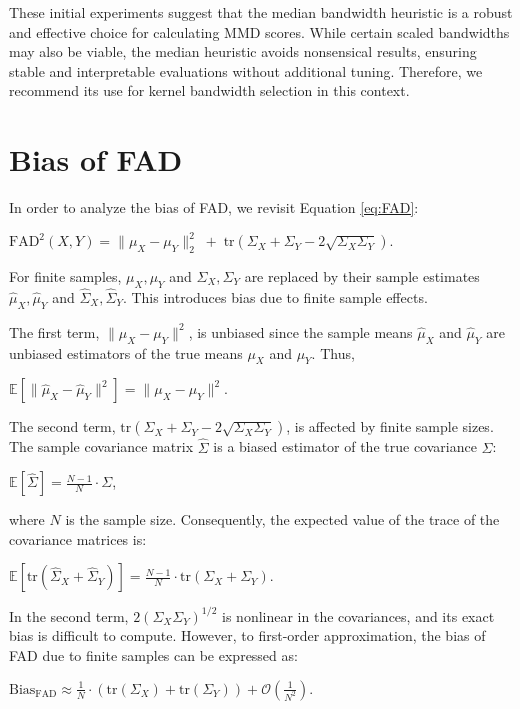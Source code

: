 These initial experiments suggest that the median bandwidth heuristic is a robust and effective choice for calculating MMD scores. While certain scaled bandwidths may also be viable, the median heuristic avoids nonsensical results, ensuring stable and interpretable evaluations without additional tuning. Therefore, we recommend its use for kernel bandwidth selection in this context.


\section{Bias of FAD}
\label{sec:appendix_fad_bias}

In order to analyze the bias of FAD, we revisit Equation \ref{eq:FAD}:

\begin{center}
    $\text{FAD}^2(X,Y) = \|\mu_X - \mu_Y\|_2^2 \;+\; \text{tr}\left(\Sigma_X + \Sigma_Y - 2\sqrt{\Sigma_X \Sigma_Y}\right).$
\end{center}

For finite samples, $\mu_X, \mu_Y$ and $\Sigma_X, \Sigma_Y$ are replaced by their sample estimates $\hat{\mu}_X, \hat{\mu}_Y$ and $\hat{\Sigma}_X, \hat{\Sigma}_Y$. This introduces bias due to finite sample effects.

The first term, $\|\mu_X - \mu_Y\|^2$, is unbiased since the sample means $\hat{\mu}_X$ and $\hat{\mu}_Y$ are unbiased estimators of the true means $\mu_X$ and $\mu_Y$. Thus,
\begin{center}
    $\mathbb{E}[\|\hat{\mu}_X - \hat{\mu}_Y\|^2] = \|\mu_X - \mu_Y\|^2.$
\end{center}

The second term, $\text{tr}\left(\Sigma_X + \Sigma_Y - 2\sqrt{\Sigma_X \Sigma_Y}\right)$, is affected by finite sample sizes. The sample covariance matrix $\hat{\Sigma}$ is a biased estimator of the true covariance $\Sigma$:
\begin{center}
    $\mathbb{E}[\hat{\Sigma}] = \frac{N-1}{N} \cdot \Sigma$,
\end{center}

where $N$ is the sample size. Consequently, the expected value of the trace of the covariance matrices is:
\begin{center}
    $\mathbb{E}[\text{tr}(\hat{\Sigma}_X + \hat{\Sigma}_Y)] = \frac{N-1}{N} \cdot \text{tr}(\Sigma_X + \Sigma_Y).$
\end{center}

In the second term, $2 (\Sigma_X \Sigma_Y)^{1/2}$ is nonlinear in the covariances, and its exact bias is difficult to compute. However, to first-order approximation, the bias of FAD due to finite samples can be expressed as:
\begin{center}
    $\text{Bias}_{\text{FAD}} \approx \frac{1}{N} \cdot (\text{tr}(\Sigma_X) + \text{tr}(\Sigma_Y)) + \mathcal{O}\left(\frac{1}{N^2}\right).$
\end{center}

